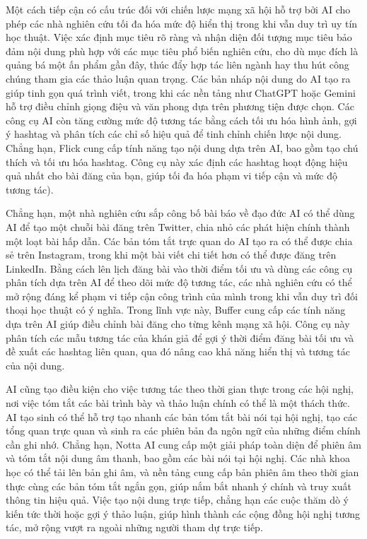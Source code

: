 Một cách tiếp cận có cấu trúc đối với chiến lược mạng xã hội hỗ trợ bởi AI cho phép các nhà nghiên cứu tối đa hóa mức độ hiển thị trong khi vẫn duy trì uy tín học thuật. Việc xác định mục tiêu rõ ràng và nhận diện đối tượng mục tiêu bảo đảm nội dung phù hợp với các mục tiêu phổ biến nghiên cứu, cho dù mục đích là quảng bá một ấn phẩm gần đây, thúc đẩy hợp tác liên ngành hay thu hút công chúng tham gia các thảo luận quan trọng. Các bản nháp nội dung do AI tạo ra giúp tinh gọn quá trình viết, trong khi các nền tảng như ChatGPT hoặc Gemini hỗ trợ điều chỉnh giọng điệu và văn phong dựa trên phương tiện được chọn. Các công cụ AI còn tăng cường mức độ tương tác bằng cách tối ưu hóa hình ảnh, gợi ý hashtag và phân tích các chỉ số hiệu quả để tinh chỉnh chiến lược nội dung. Chẳng hạn, Flick cung cấp tính năng tạo nội dung dựa trên AI, bao gồm tạo chú thích và tối ưu hóa hashtag. Công cụ này xác định các hashtag hoạt động hiệu quả nhất cho bài đăng của bạn, giúp tối đa hóa phạm vi tiếp cận và mức độ tương tác).

Chẳng hạn, một nhà nghiên cứu sắp công bố bài báo về đạo đức AI có thể dùng AI để tạo một chuỗi bài đăng trên Twitter, chia nhỏ các phát hiện chính thành một loạt bài hấp dẫn. Các bản tóm tắt trực quan do AI tạo ra có thể được chia sẻ trên Instagram, trong khi một bài viết chi tiết hơn có thể được đăng trên LinkedIn. Bằng cách lên lịch đăng bài vào thời điểm tối ưu và dùng các công cụ phân tích dựa trên AI để theo dõi mức độ tương tác, các nhà nghiên cứu có thể mở rộng đáng kể phạm vi tiếp cận công trình của mình trong khi vẫn duy trì đối thoại học thuật có ý nghĩa. Trong lĩnh vực này, Buffer cung cấp các tính năng dựa trên AI giúp điều chỉnh bài đăng cho từng kênh mạng xã hội. Công cụ này phân tích các mẫu tương tác của khán giả để gợi ý thời điểm đăng bài tối ưu và đề xuất các hashtag liên quan, qua đó nâng cao khả năng hiển thị và tương tác của nội dung.

AI cũng tạo điều kiện cho việc tương tác theo thời gian thực trong các hội nghị, nơi việc tóm tắt các bài trình bày và thảo luận chính có thể là một thách thức. AI tạo sinh có thể hỗ trợ tạo nhanh các bản tóm tắt bài nói tại hội nghị, tạo các tổng quan trực quan và sinh ra các phiên bản đa ngôn ngữ của những điểm chính cần ghi nhớ. Chẳng hạn, Notta AI cung cấp một giải pháp toàn diện để phiên âm và tóm tắt nội dung âm thanh, bao gồm các bài nói tại hội nghị. Các nhà khoa học có thể tải lên bản ghi âm, và nền tảng cung cấp bản phiên âm theo thời gian thực cùng các bản tóm tắt ngắn gọn, giúp nắm bắt nhanh ý chính và truy xuất thông tin hiệu quả. Việc tạo nội dung trực tiếp, chẳng hạn các cuộc thăm dò ý kiến tức thời hoặc gợi ý thảo luận, giúp hình thành các cộng đồng hội nghị tương tác, mở rộng vượt ra ngoài những người tham dự trực tiếp.

